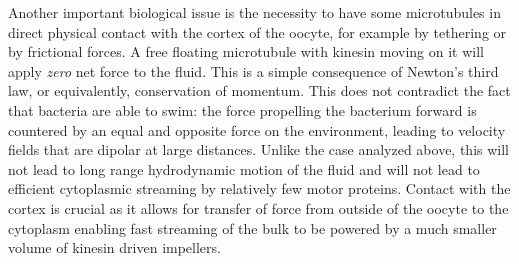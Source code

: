 \documentclass[11pt]{ucthesis}
\def\br{{\bf r}}
\begin{document}
Another important biological issue is the necessity to have some microtubules in direct physical contact
with the cortex of the
oocyte, for example by tethering or by frictional forces. A free floating microtubule with kinesin moving on it will apply {\em zero} net force
to the fluid. This is a simple consequence of Newton's third law, or equivalently, conservation
of momentum. This does not contradict
the fact that bacteria are able to swim: the force propelling the bacterium forward is
countered by an equal and opposite force on the environment, leading to velocity fields that
are dipolar at large distances. Unlike the case analyzed above, this will not lead to long range hydrodynamic motion
of the fluid and will not lead to efficient cytoplasmic streaming by relatively few motor proteins. 
Contact with the cortex is crucial as it allows for transfer of force from outside of
the oocyte to the cytoplasm enabling fast streaming of the bulk to be powered by a much smaller volume of kinesin driven
impellers.


\end{document}
